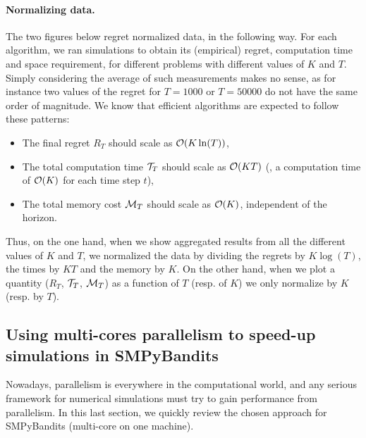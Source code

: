 \paragraph{Normalizing data.}
%
The two figures below regret normalized data, in the following way.
For each algorithm, we ran simulations to obtain its (empirical) regret, computation time and space requirement, for different problems with different values of $K$ and $T$.
Simply considering the average of such measurements makes no sense, as for instance two values of the regret for $T=1000$ or $T=50000$ do not have the same order of magnitude.
%
We know that efficient algorithms are expected to follow these patterns:
\begin{itemize}\tightlist
    \item The final regret $R_T$ should scale as $\mathcal{O}(K \ln(T))$,
    \item The total computation time $\mathcal{T}_T$ should scale as $\mathcal{O}(K T)$ (\ie, a computation time of $\mathcal{O}(K)$ for each time step $t$),
    \item The total memory cost $\mathcal{M}_T$ should scale as $\mathcal{O}(K)$, independent of the horizon.
\end{itemize}
Thus, on the one hand, when we show aggregated results from all the different values of $K$ and $T$, we normalized the data by dividing the regrets by $K \log(T)$, the times by $K T$ and the memory by $K$.
%
On the other hand, when we plot a quantity ($R_T$, $\mathcal{T}_T$, $\mathcal{M}_T$) as a function of $T$ (resp. of $K$) we only normalize by $K$ (resp. by $T$).


\subsection{Using multi-cores parallelism to speed-up simulations in SMPyBandits}
\label{sub:3:parallelSimulations}


Nowadays, parallelism is everywhere in the computational world, and any serious framework for numerical simulations must try to gain performance from parallelism.
In this last section, we quickly review the chosen approach for SMPyBandits (multi-core on one machine).

